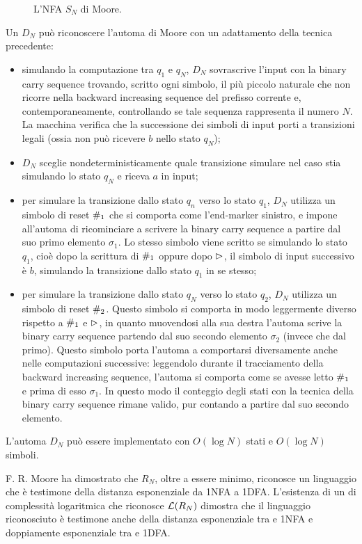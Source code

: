 \begin{figure}
	\centering
	
	\caption{L'NFA $S_N$ di Moore.}
	\label{img:wit:Rn}
\end{figure}

Un  $D_N$ può riconoscere l'automa di Moore con un adattamento della tecnica precedente:
\begin{itemize}
	\item simulando la computazione tra $q_1$ e $q_N$, $D_N$ sovrascrive l'input con la binary carry sequence trovando, scritto ogni simbolo, il più piccolo naturale che non ricorre nella backward increasing sequence del prefisso corrente e, contemporaneamente, controllando se tale sequenza rappresenta il numero $N$. La macchina verifica che la successione dei simboli di input porti a transizioni legali (ossia non può ricevere $b$ nello stato $q_N$);
	\item $D_N$ sceglie nondeterministicamente quale transizione simulare nel caso stia simulando lo stato $q_N$ e riceva $a$ in input;
	\item per simulare la transizione dallo stato $q_n$ verso lo stato $q_1$, $D_N$ utilizza un simbolo di reset $\#_1$ che si comporta come l'end-marker sinistro, e impone all'automa di ricominciare a scrivere la binary carry sequence a partire dal suo primo elemento $\sigma_1$. Lo stesso simbolo viene scritto se simulando lo stato $q_1$, cioè dopo la scrittura di $\#_1$ oppure dopo $\rhd$, il simbolo di input successivo è $b$, simulando la transizione dallo stato $q_1$ in se stesso;
	\item per simulare la transizione dallo stato $q_N$ verso lo stato $q_2$, $D_N$ utilizza un simbolo di reset $\#_2$. Questo simbolo si comporta in modo leggermente diverso rispetto a $\#_1$ e $\rhd$, in quanto muovendosi alla sua destra l'automa scrive la binary carry sequence partendo dal suo secondo elemento $\sigma_2$ (invece che dal primo). Questo simbolo porta l'automa a comportarsi diversamente anche nelle computazioni successive: leggendolo durante il tracciamento della backward increasing sequence, l'automa si comporta come se avesse letto $\#_1$ e prima di esso $\sigma_1$. In questo modo il conteggio degli stati con la tecnica della binary carry sequence rimane valido, pur contando a partire dal suo secondo elemento.
\end{itemize}
L'automa $D_N$ può essere implementato con $O(\log N)$ stati e $O(\log N)$ simboli.

F. R. Moore ha dimostrato che $R_N$, oltre a essere minimo, riconosce un linguaggio che è testimone della distanza esponenziale da 1NFA a 1DFA. L'esistenza di un  di complessità logaritmica che riconosce $\mathcal L(R_N)$ dimostra che il linguaggio riconosciuto è testimone anche della distanza esponenziale tra  e 1NFA e doppiamente esponenziale tra  e 1DFA.
